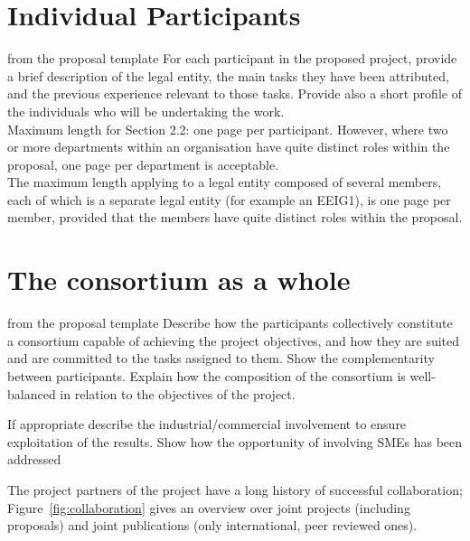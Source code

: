\section{Individual Participants}\label{sec:partners}
\begin{todo}{from the proposal template}
For each participant in the proposed project, provide a brief description of the legal entity, the main
tasks they have been attributed, and the previous experience relevant to those tasks. Provide also a
short profile of the individuals who will be undertaking the work.\\
Maximum length for Section 2.2: one page per participant. However, where two or more departments within
an organisation have quite distinct roles within the proposal, one page per department is acceptable.\\
The maximum length applying to a legal entity composed of several members, each of which is a separate
legal entity (for example an EEIG1), is one page per member, provided that the members have quite distinct
roles within the proposal.
\end{todo}
\newpage
\newpage
\newpage
\newpage
\newpage

\section{The {\protect\pn} consortium as a whole}
\begin{todo}{from the proposal template}
  Describe how the participants collectively constitute a consortium capable of achieving
  the project objectives, and how they are suited and are committed to the tasks assigned
  to them. Show the complementarity between participants. Explain how the composition of
  the consortium is well-balanced in relation to the objectives of the project.  

  If appropriate describe the industrial/commercial involvement to ensure exploitation of
  the results. Show how the opportunity of involving SMEs has been addressed
\end{todo}

The project partners of the \pn project have a long history of successful collaboration;
Figure~\ref{fig:collaboration} gives an overview over joint projects (including proposals) and
joint publications (only international, peer reviewed ones).

\coherencetable

